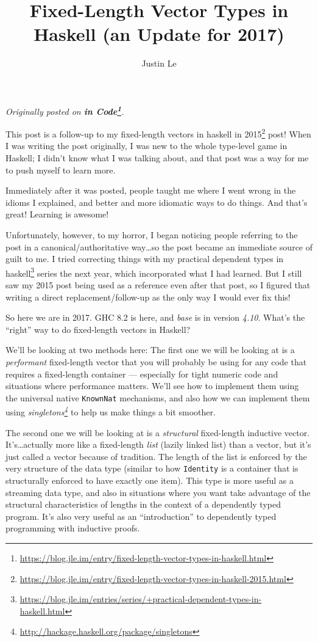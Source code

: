 \documentclass[]{article}
\title{Fixed-Length Vector Types in Haskell (an Update for 2017)}
\author{Justin Le}
\renewcommand{\href}[2]{#2\footnote{\url{#1}}}
\begin{document}
\maketitle

\emph{Originally posted on
\textbf{\href{https://blog.jle.im/entry/fixed-length-vector-types-in-haskell.html}{in
Code}}.}

This post is a follow-up to my
\href{https://blog.jle.im/entry/fixed-length-vector-types-in-haskell-2015.html}{fixed-length
vectors in haskell in 2015} post! When I was writing the post originally, I was
new to the whole type-level game in Haskell; I didn't know what I was talking
about, and that post was a way for me to push myself to learn more.

Immediately after it was posted, people taught me where I went wrong in the
idioms I explained, and better and more idiomatic ways to do things. And that's
great! Learning is awesome!

Unfortunately, however, to my horror, I began noticing people referring to the
post in a canonical/authoritative way\ldots{}so the post became an immediate
source of guilt to me. I tried correcting things with my
\href{https://blog.jle.im/entries/series/+practical-dependent-types-in-haskell.html}{practical
dependent types in haskell} series the next year, which incorporated what I had
learned. But I still saw my 2015 post being used as a reference even after that
post, so I figured that writing a direct replacement/follow-up as the only way I
would ever fix this!

So here we are in 2017. GHC 8.2 is here, and \emph{base} is in version
\emph{4.10}. What's the ``right'' way to do fixed-length vectors in Haskell?

We'll be looking at two methods here: The first one we will be looking at is a
\emph{performant} fixed-length vector that you will probably be using for any
code that requires a fixed-length container --- especially for tight numeric
code and situations where performance matters. We'll see how to implement them
using the universal native \texttt{KnownNat} mechanisms, and also how we can
implement them using
\emph{\href{http://hackage.haskell.org/package/singletons}{singletons}} to help
us make things a bit smoother.

The second one we will be looking at is a \emph{structural} fixed-length
inductive vector. It's\ldots{}actually more like a fixed-length \emph{list}
(lazily linked list) than a vector, but it's just called a vector because of
tradition. The length of the list is enforced by the very structure of the data
type (similar to how \texttt{Identity} is a container that is structurally
enforced to have exactly one item). This type is more useful as a streaming data
type, and also in situations where you want take advantage of the structural
characteristics of lengths in the context of a dependently typed program. It's
also very useful as an ``introduction'' to dependently typed programming with
inductive proofs.
\end{document}
